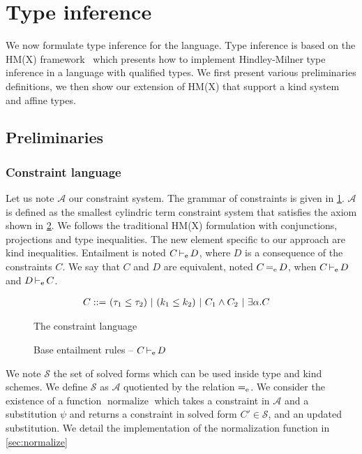 \section{Type inference}

We now formulate type inference for the \lang language. Type inference is
based on the HM(X) framework~\citep{DBLP:journals/tapos/OderskySW99} which
presents how to implement Hindley-Milner type inference in a language
with qualified types. We first present various preliminaries definitions,
we then show our extension of HM(X) that support a kind system and affine
types.

\subsection{Preliminaries}

\subsubsection{Constraint language}

\newcommand\A{\mathcal A}
\newcommand\SC{\mathcal S}

Let us note $\A$ our constraint system. The grammar of constraints is
given in  \cref{grammar:constraint}.
$\A$ is defined as the smallest cylindric term constraint system that
satisfies the axiom shown in \cref{rules:entail}.
We follows the traditional HM(X) formulation
with conjunctions, projections and type inequalities.
The new element specific to our approach are kind inequalities.
Entailment is noted $C \operatorname{\vdash_e} D$, where $D$ is a consequence of the
constraints $C$.
We say that $C$ and $D$ are equivalent, noted $C \operatorname{=_e} D$,
when $C \operatorname{\vdash_e} D$ and $D \operatorname{\vdash_e} C$.


\begin{figure}[tp]
  \centering
  \begin{align*}
    C ::=&\ (\tau_1 \leq \tau_2)\ |\ (k_1 \leq k_2)\ |\ C_1 \wedge C_2\ |\ \exists \alpha.C
  \end{align*}
  \caption{The constraint language}
  \label{grammar:constraint}
\end{figure}

\begin{figure*}[tp]
  
  \caption{Base entailment rules -- $C \operatorname{\vdash_e} D$ }
  \label{rules:entail}
\end{figure*}


We note $\SC$ the set of solved forms
which can be used inside type and kind schemes.
We define $\SC$ as $\A$ quotiented by the relation $\operatorname{=_e}$.
%
We consider the existence of a function $\operatorname{normalize}$ which takes
a constraint in $\A$ and a substitution $\psi$ and returns a constraint
in solved form $C' \in \SC$,
and an updated substitution. We detail the implementation
of the normalization function in \cref{sec:normalize}


